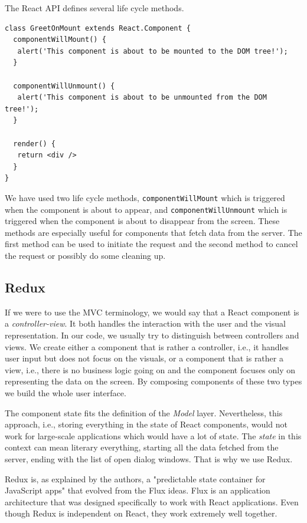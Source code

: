 The React API defines several life cycle methods.

\begin{verbatim}
class GreetOnMount extends React.Component {
  componentWillMount() {
   alert('This component is about to be mounted to the DOM tree!');
  }
  
  componentWillUnmount() {
   alert('This component is about to be unmounted from the DOM tree!');
  }
  
  render() {
   return <div />
  }
}
\end{verbatim}

We have used two life cycle methods, \texttt{componentWillMount} which is triggered when the component is about to appear, and \texttt{componentWillUnmount} which is triggered when the component is about to disappear from the screen. These methods are especially useful for components that fetch data from the server. The first method can be used to initiate the request and the second method to cancel the request or possibly do some cleaning up.

\subsection{Redux}
\label{sec:implementation:frontend-development-stack:redux}

If we were to use the MVC terminology, we would say that a React component is a \emph{controller-view}. It both handles the interaction with the user and the visual representation. In our code, we usually try to distinguish between controllers and views. We create either a component that is rather a controller, i.e., it handles user input but does not focus on the visuals, or a component that is rather a view, i.e., there is no business logic going on and the component focuses only on representing the data on the screen. By composing components of these two types we build the whole user interface.

The component state fits the definition of the \emph{Model} layer. Nevertheless, this approach, i.e., storing everything in the state of React components, would not work for large-scale applications which would have a lot of state. The \emph{state} in this context can mean literary everything, starting all the data fetched from the server, ending with the list of open dialog windows. That is why we use Redux.

Redux \cite{redux} is, as explained by the authors, a "predictable state container for JavaScript apps" that evolved from the Flux ideas. Flux \cite{flux} is an application architecture that was designed specifically to work with React applications. Even though Redux is independent on React, they work extremely well together. 

